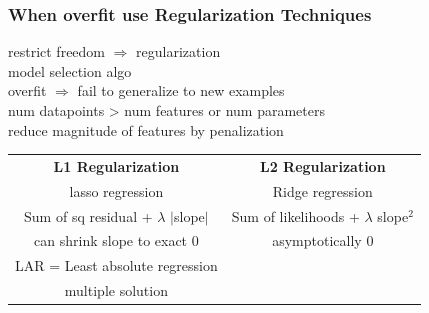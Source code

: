\documentclass{beamer}
\begin{document}
\begin{frame}\frametitle{When overfit use Regularization Techniques}
	restrict freedom $\Rightarrow$ regularization\\
	model selection algo\\
	overfit $\Rightarrow$ fail to generalize to new examples\\
	num datapoints > num features or num parameters\\
	reduce magnitude of features by penalization\\
	\begin{tabular}{c|c}
			\textbf{L1 Regularization} & \textbf{L2 Regularization}\\ 
			lasso regression & Ridge regression\\ \hline
				
			Sum of sq residual + $\lambda$ $|$slope$|$
			& Sum of likelihoods + $\lambda$ slope$^2$
			\\ \hline
			can shrink slope to exact 0
			& asymptotically 0
			\\ \hline
			LAR = Least absolute regression 
			& \\
			multiple solution
			& \\ \hline
	\end{tabular}

\end{frame}
\end{document}
